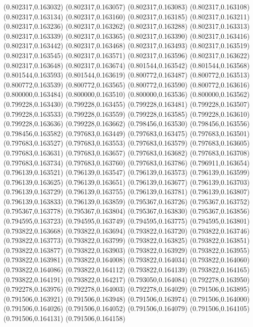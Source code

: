 (0.802317,0.163032)
(0.802317,0.163057)
(0.802317,0.163083)
(0.802317,0.163108)
(0.802317,0.163134)
(0.802317,0.163160)
(0.802317,0.163185)
(0.802317,0.163211)
(0.802317,0.163236)
(0.802317,0.163262)
(0.802317,0.163288)
(0.802317,0.163313)
(0.802317,0.163339)
(0.802317,0.163365)
(0.802317,0.163390)
(0.802317,0.163416)
(0.802317,0.163442)
(0.802317,0.163468)
(0.802317,0.163493)
(0.802317,0.163519)
(0.802317,0.163545)
(0.802317,0.163571)
(0.802317,0.163596)
(0.802317,0.163622)
(0.802317,0.163648)
(0.802317,0.163674)
(0.801544,0.163542)
(0.801544,0.163568)
(0.801544,0.163593)
(0.801544,0.163619)
(0.800772,0.163487)
(0.800772,0.163513)
(0.800772,0.163539)
(0.800772,0.163565)
(0.800772,0.163590)
(0.800772,0.163616)
(0.800000,0.163484)
(0.800000,0.163510)
(0.800000,0.163536)
(0.800000,0.163562)
(0.799228,0.163430)
(0.799228,0.163455)
(0.799228,0.163481)
(0.799228,0.163507)
(0.799228,0.163533)
(0.799228,0.163559)
(0.799228,0.163585)
(0.799228,0.163610)
(0.799228,0.163636)
(0.799228,0.163662)
(0.798456,0.163530)
(0.798456,0.163556)
(0.798456,0.163582)
(0.797683,0.163449)
(0.797683,0.163475)
(0.797683,0.163501)
(0.797683,0.163527)
(0.797683,0.163553)
(0.797683,0.163579)
(0.797683,0.163605)
(0.797683,0.163631)
(0.797683,0.163657)
(0.797683,0.163682)
(0.797683,0.163708)
(0.797683,0.163734)
(0.797683,0.163760)
(0.797683,0.163786)
(0.796911,0.163654)
(0.796139,0.163521)
(0.796139,0.163547)
(0.796139,0.163573)
(0.796139,0.163599)
(0.796139,0.163625)
(0.796139,0.163651)
(0.796139,0.163677)
(0.796139,0.163703)
(0.796139,0.163729)
(0.796139,0.163755)
(0.796139,0.163781)
(0.796139,0.163807)
(0.796139,0.163833)
(0.796139,0.163859)
(0.795367,0.163726)
(0.795367,0.163752)
(0.795367,0.163778)
(0.795367,0.163804)
(0.795367,0.163830)
(0.795367,0.163856)
(0.794595,0.163723)
(0.794595,0.163749)
(0.794595,0.163775)
(0.794595,0.163801)
(0.793822,0.163668)
(0.793822,0.163694)
(0.793822,0.163720)
(0.793822,0.163746)
(0.793822,0.163773)
(0.793822,0.163799)
(0.793822,0.163825)
(0.793822,0.163851)
(0.793822,0.163877)
(0.793822,0.163903)
(0.793822,0.163929)
(0.793822,0.163955)
(0.793822,0.163981)
(0.793822,0.164008)
(0.793822,0.164034)
(0.793822,0.164060)
(0.793822,0.164086)
(0.793822,0.164112)
(0.793822,0.164139)
(0.793822,0.164165)
(0.793822,0.164191)
(0.793822,0.164217)
(0.793050,0.164084)
(0.792278,0.163950)
(0.792278,0.163976)
(0.792278,0.164003)
(0.792278,0.164029)
(0.791506,0.163895)
(0.791506,0.163921)
(0.791506,0.163948)
(0.791506,0.163974)
(0.791506,0.164000)
(0.791506,0.164026)
(0.791506,0.164052)
(0.791506,0.164079)
(0.791506,0.164105)
(0.791506,0.164131)
(0.791506,0.164158)
